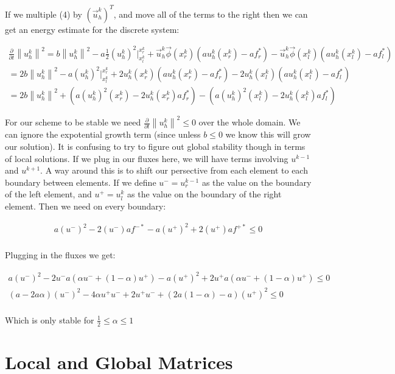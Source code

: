 \documentclass{article}
\newcommand{\norm}[1]{\left\lVert#1\right\rVert}
\begin{document}
\noindent If we multiple (4) by $(\vec{u}^k_h)^T$, and move all of the terms to the right then we can get an energy estimate for the discrete system:

\begin{gather*}
  \frac{\partial}{\partial t}\norm{u_h^k}^2 = b\norm{u_h^k}^2 - a \frac{1}{2} (u_h^k)^2\biggr\rvert_{x_l^k}^{x^k_r} + \vec{u}_h^k\vec{\phi}(x_r^k)(au_h^k(x_r^k) - af^*_r) -  \vec{u}_h^k\vec{\phi}(x_l^k)(au_h^k(x_l^k) - af^*_l)\\
  = 2b\norm{u_h^k}^2 - a (u_h^k)^2\biggr\rvert_{x_l^k}^{x^k_r} + 2 u_h^k(x_r^k)(au_h^k(x_r^k) - af^*_r) - 2u_h^k(x_l^k)(au_h^k(x_l^k) - af^*_l)\\
  = 2b\norm{u_h^k}^2 + (a(u_h^k)^2(x_r^k) - 2u_h^k(x_r^k)af^*_r) - (a(u_h^k)^2(x_l^k) - 2u_h^k(x_l^k)af^*_l)
\end{gather*}

\noindent For our scheme to be stable we need $\frac{\partial}{\partial t}\norm{u_h^k}^2 \leq 0$ over the whole domain. We can ignore the expotential growth term (since unless $b \leq 0$ we know this will grow our solution). It is confusing to try to figure out global stability though in terms of local solutions. If we plug in our fluxes here, we will have terms involving $u^{k-1}$ and $u^{k+1}$. A way around this is to shift our persective from each element to each boundary between elements. If we define $u^- = u^{k-1}_r$ as the value on the boundary of the left element, and $u^+ = u^k_l$ as the value on the boundary of the right element. Then we need on every boundary:

\begin{gather*}
   a(u^-)^2 - 2(u^-)af^{-*} - a(u^+)^2 + 2(u^+)af^{+*} \leq 0\\
\end{gather*}

\noindent Plugging in the fluxes we get:

\begin{gather*}
  a(u^-)^2 - 2u^-a(\alpha u^- + (1-\alpha)u^+) - a(u^+)^2 + 2u^+a(\alpha u^- + (1-\alpha)u^+)\leq 0\\
  (a -2 a \alpha)(u^-)^2 - 4\alpha u^+ u^- + 2u^+u^- + (2a(1- \alpha) - a)(u^+)^2 \leq 0\\
\end{gather*}

Which is only stable for $ \frac{1}{2} \leq \alpha \leq 1$


\section{Local and Global Matrices}
\end{document}
